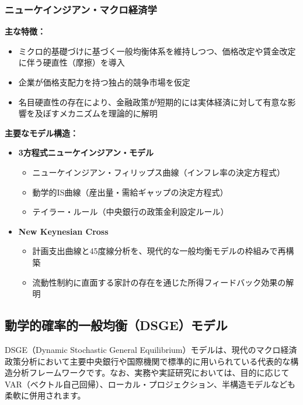 \documentclass[
  japanese,
  lualatex,
  ja=standard,
  12pt,
  a4paper]{ltjsarticle}
\providecommand{\tightlist}{%
  \setlength{\itemsep}{0pt}\setlength{\parskip}{0pt}}
\begin{document}
\subsubsection{ニューケインジアン・マクロ経済学}\label{ux30cbux30e5ux30fcux30b1ux30a4ux30f3ux30b8ux30a2ux30f3ux30deux30afux30edux7d4cux6e08ux5b66}

\textbf{主な特徴：}

\begin{itemize}
\tightlist
\item
  ミクロ的基礎づけに基づく一般均衡体系を維持しつつ、価格改定や賃金改定に伴う硬直性（摩擦）を導入
\item
  企業が価格支配力を持つ独占的競争市場を仮定
\item
  名目硬直性の存在により、金融政策が短期的には実体経済に対して有意な影響を及ぼすメカニズムを理論的に解明
\end{itemize}

\textbf{主要なモデル構造：}

\begin{itemize}
\tightlist
\item
  \textbf{3方程式ニューケインジアン・モデル}

  \begin{itemize}
  \tightlist
  \item
    ニューケインジアン・フィリップス曲線（インフレ率の決定方程式）
  \item
    動学的IS曲線（産出量・需給ギャップの決定方程式）
  \item
    テイラー・ルール（中央銀行の政策金利設定ルール）
  \end{itemize}
\item
  \textbf{New Keynesian Cross}

  \begin{itemize}
  \tightlist
  \item
    計画支出曲線と45度線分析を、現代的な一般均衡モデルの枠組みで再構築
  \item
    流動性制約に直面する家計の存在を通じた所得フィードバック効果の解明
  \end{itemize}
\end{itemize}

\subsection{動学的確率的一般均衡（DSGE）モデル}\label{ux52d5ux5b66ux7684ux78baux7387ux7684ux4e00ux822cux5747ux8861dsgeux30e2ux30c7ux30eb}

DSGE（Dynamic Stochastic General
Equilibrium）モデルは、現代のマクロ経済政策分析において主要中央銀行や国際機関で標準的に用いられている代表的な構造分析フレームワークです。なお、実務や実証研究においては、目的に応じてVAR（ベクトル自己回帰）、ローカル・プロジェクション、半構造モデルなども柔軟に併用されます。
\end{document}

